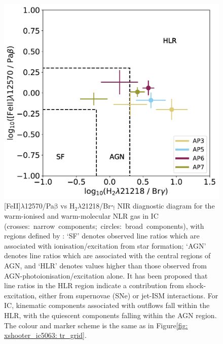 \begin{figure}[!ht]
	\centering
	\includegraphics[width=0.75\linewidth]{figures/xshooter_ic5063/feii_pab.pdf}
	\caption[{[}FeII{]}$\lambda$12570/Pa$\mathrm{\beta}$ vs H$_2 \lambda$21218/Br$\mathrm{\gamma}$ NIR diagnostic diagram for the warm-ionised and warm-molecular NLR gas in IC.]{{[}FeII{]}$\lambda$12570/Pa$\mathrm{\beta}$ vs H$_2 \lambda$21218/Br$\mathrm{\gamma}$ NIR diagnostic diagram for the warm-ionised and warm-molecular NLR gas in IC \mbox{(crosses: narrow components; circles: broad components)}, with regions defined by \citet{Riffel2021}: `SF' denotes observed line ratios which are associated with ionisation/excitation from star formation; `AGN' denotes line ratios which are associated with the central regions of AGN, and `HLR' denotes values higher than those observed from AGN-photoionisation/excitation alone. It has been proposed that line ratios in the HLR region indicate a contribution from shock-excitation, either from supernovae (SNe) or jet-ISM interactions. For IC, kinematic components associated with outflows fall within the HLR, with the quiescent components falling within the AGN region. The colour and marker scheme is the same as in Figure\;\ref{fig: xshooter_ic5063: tr_grid}.}
	\label{fig: xshooter_ic5063: feii_pab}
\end{figure}

